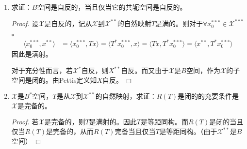 \begin{enumerate}[leftmargin=2cm, label=\arabic*]
\begin{proof}
        而现在对$\forall x^{**}\in\mathscr{X}^{**}$，
        \begin{align*}
            x^{**}(f) = x^{**}\left(\sum\limits_{i=1}^n  f(e_i)f_i\right) = \sum\limits_{i=1}^n  f(e_i)x^{**}(f_i) = \left\langle \sum\limits_{i=1}^n  e_i x^{**}(f_i), f \right\rangle 
        \end{align*}

        因此
        \begin{align*}
            x^{**} = \sum\limits_{i=1}^n x^{**}(f_i)  e_i 
        \end{align*}
        因此从$\mathscr{X}$到$\mathscr{X}^{**}$的自然映射是满的，因此是自反的。
    \end{proof}

    \item 求证：$B$空间是自反的，当且仅当它的共轭空间是自反的。
    \begin{proof}
        设$\mathscr{X}$是自反的，记从$\mathscr{X}$到$\mathscr{X}^{**}$的自然映射$T$是满的。则对于$\forall x_0^{***}\in\mathscr{X}^{***}$。
        \begin{align*}
           \langle x_0^{***}, x^{**}\rangle &= \langle x_0^{***}, Tx\rangle = \langle T^* x_0^{***}, x\rangle = \langle Tx,T^*x_0^{***} \rangle =  \langle x^{**},T^*x_0^{***}\rangle 
        \end{align*}
        因此是满射。

        对于充分性而言，若$\mathscr{X}^*$自反，则$X^{**}$自反。而又由于$\mathscr{X}$是$B$空间，作为$\mathscr{X}$的子空间是闭的。由Pettis定义知$X$自反。
    \end{proof}

    \item $\mathscr{X}$是$B^*$空间，$T$是从$\mathscr{X}$到$\mathscr{X}^{**}$的自然映射，求证：$R(T)$是闭的的充要条件是$\mathscr{X}$是完备的。
    \begin{proof}
        若$\mathscr{X}$是完备的，则$T$是满射的。因此$T$是等距同构。而$R(T)$是闭的当且仅当$R(T)$是完备的，从而$R(T)$完备当且仅当$T$是等距同构。（由于$\mathscr{X}^{**}$是$B$空间）
    \end{proof}


\end{enumerate}
